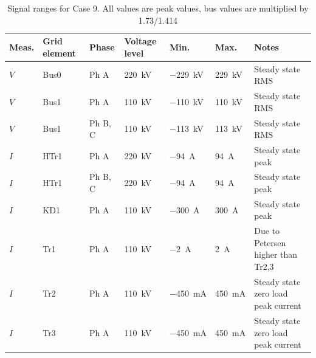 
\begin{table}[htbp]
  \centering
  \caption{Signal ranges for Case 9. All values are peak values, bus values are multiplied by 1.73/1.414}
  \label{tab:measurement-values-case9}
  \small
  \setlength{\tabcolsep}{3.5pt}
  \renewcommand{\arraystretch}{1.18}
  \begin{tabularx}{\textwidth}{@{}
      >{\raggedright\arraybackslash}p{}
      >{\raggedright\arraybackslash}p{}
      >{\raggedright\arraybackslash}p{}
      >{\raggedright\arraybackslash}p{}
      >{\raggedright\arraybackslash}p{}
      >{\raggedright\arraybackslash}p{}
      Y@{}}
    \toprule
    \textbf{Meas.} &
    \textbf{Grid element} &
    \textbf{Phase} &
    \textbf{Voltage level} &
    \textbf{Min.} &
    \textbf{Max.} &
    \textbf{Notes} \\
    \midrule
    $V$ & Bus0  & Ph A       & \SI{220}{\kilo\volt} & \SI{-229}{\kilo\volt} & \SI{229}{\kilo\volt} & Steady state RMS \\
    $V$ & Bus1  & Ph A       & \SI{110}{\kilo\volt} & \SI{-110}{\kilo\volt} & \SI{110}{\kilo\volt} & Steady state RMS \\
    $V$ & Bus1  & Ph B, C    & \SI{110}{\kilo\volt} & \SI{-113}{\kilo\volt} & \SI{113}{\kilo\volt} & Steady state RMS \\
    $I$ & HTr1  & Ph A       & \SI{220}{\kilo\volt} & \SI{-94}{\ampere} & \SI{94}{\ampere} & Steady state peak \\
    $I$ & HTr1  & Ph B, C    & \SI{220}{\kilo\volt} & \SI{-94}{\ampere} & \SI{94}{\ampere} & Steady state peak \\
    $I$ & KD1   & Ph A       & \SI{110}{\kilo\volt} & \SI{-300}{\ampere} & \SI{300}{\ampere} & Steady state peak \\
    $I$ & Tr1   & Ph A       & \SI{110}{\kilo\volt} & \SI{-2}{\ampere} & \SI{2}{\ampere} & Due to Petersen higher than Tr2,3 \\
    $I$ & Tr2   & Ph A       & \SI{110}{\kilo\volt} & \SI{-450}{\milli\ampere} & \SI{450}{\milli\ampere} & Steady state zero load peak current \\
    $I$ & Tr3   & Ph A      & \SI{110}{\kilo\volt} & \SI{-450}{\milli\ampere} & \SI{450}{\milli\ampere} & Steady state zero load peak current \\

\end{tabularx}
\end{table}
